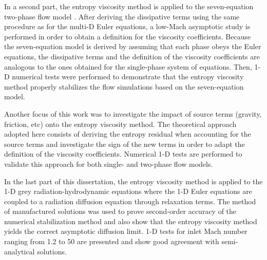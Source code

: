 In a second part, the entropy viscosity method is applied to the seven-equation two-phase flow model \cite{SEM}. After deriving the dissipative terms using the same procedure as for the multi-D Euler equations, a low-Mach asymptotic study is performed in order to obtain a definition for the viscosity coefficients. Because the seven-equation model is derived by assuming that each phase obeys the Euler equations, the dissipative terms and the definition of the viscosity coefficients are analogous to the ones obtained for the single-phase system of equations. Then, 1-D numerical tests were performed to demonstrate that the entropy viscosity method  properly stabilizes the flow simulations based on the seven-equation model.

Another focus of this work was to investigate the impact of source terms (gravity, friction, etc) onto the entropy viscosity method. The theoretical approach adopted here consists of deriving the entropy residual when accounting for the source terms and investigate the sign of the new terms in order to adapt the definition of the viscosity coefficients. Numerical 1-D tests are performed to validate this approach for both single- and two-phase flow models.

In the last part of this dissertation, the entropy viscosity method is applied to the 1-D grey radiation-hydrodynamic equations where the 1-D Euler equations are coupled to a radiation diffusion equation through relaxation terms. The method of manufactured solutions was used to prove second-order accuracy of the numerical stabilization method and also show that the entropy viscosity method yields the correct asymptotic diffusion limit. 1-D tests for inlet Mach number ranging from 1.2 to 50 are presented and show good agreement with semi-analytical solutions.  

\pagebreak{}
